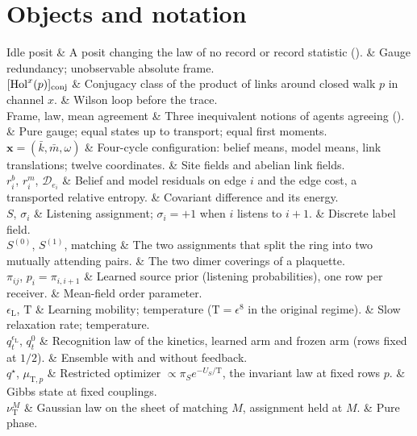 \section{Objects and notation}
\label{comp:ch14-notation}

\begin{decoder}
Idle posit & A posit changing the law of no record or record statistic (). & Gauge redundancy; unobservable absolute frame. \\
$[\mathrm{Hol}^x(p)]_{\rm conj}$ & Conjugacy class of the product of links around closed walk $p$ in channel $x$. & Wilson loop before the trace. \\
Frame, law, mean agreement & Three inequivalent notions of agents agreeing (). & Pure gauge; equal states up to transport; equal first moments. \\
$\mathbf x=(\bar k,\bar m,\omega)$ & Four-cycle configuration: belief means, model means, link translations; twelve coordinates. & Site fields and abelian link fields. \\
$r^b_i$, $r^m_i$, $\mathcal D_{e_i}$ & Belief and model residuals on edge $i$ and the edge cost, a transported relative entropy. & Covariant difference and its energy. \\
$S$, $\sigma_i$ & Listening assignment; $\sigma_i=+1$ when $i$ listens to $i+1$. & Discrete label field. \\
$S^{(0)}$, $S^{(1)}$, matching & The two assignments that split the ring into two mutually attending pairs. & The two dimer coverings of a plaquette. \\
$\pi_{ij}$, $p_i=\pi_{i,i+1}$ & Learned source prior (listening probabilities), one row per receiver. & Mean-field order parameter. \\
$\epsilon_{\mathrm L}$, $\mathrm T$ & Learning mobility; temperature ($\mathrm T=\epsilon^8$ in the original regime). & Slow relaxation rate; temperature. \\
$q^{\epsilon_{\mathrm L}}_t$, $q^0_t$ & Recognition law of the kinetics, learned arm and frozen arm (rows fixed at $1/2$). & Ensemble with and without feedback. \\
$q^\star$, $\mu_{\mathrm T,p}$ & Restricted optimizer $\propto\pi_Se^{-U_S/\mathrm T}$, the invariant law at fixed rows $p$. & Gibbs state at fixed couplings. \\
$\nu^M_{\mathrm T}$ & Gaussian law on the sheet of matching $M$, assignment held at $M$. & Pure phase. \\

\end{decoder}
